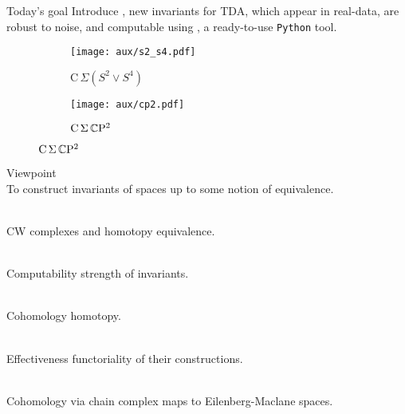
\begin{frame}{Today's goal}
	\pause
	Introduce , new invariants for TDA,
	\pause
	which appear in real-data, are robust to noise, and computable using , a ready-to-use \texttt{Python} tool.

	\pause\medskip
	\vskip-15pt
	\begin{figure}
		\centering
		\begin{subfigure}[b]{0.49\textwidth}
			\centering
			\texttt{[image: aux/s2\_s4.pdf]}
			\caption{$\mathrm C\,\Sigma(S^2 \vee S^4)$}
			\label{f:s2_s4}
		\end{subfigure}
		\begin{subfigure}[b]{0.49\textwidth}
			\centering
			\texttt{[image: aux/cp2.pdf]}
			\caption{$\mathrm C\,\Sigma\,\mathbb{C}\mathrm{P}^2$}
			\label{f:cp2}
		\end{subfigure}
	\end{figure}
\end{frame}

\begin{frame}{Viewpoint}
	\pause
	 \\
	To construct invariants of spaces up to some notion of equivalence.

	\bigskip\pause
	 \\
	CW complexes and homotopy equivalence.

	\bigskip\pause
	 \\
	Computability  strength of invariants.

	\bigskip\pause
	 \\
	Cohomology  homotopy.

	\bigskip\pause
	 \\
	Effectiveness  functoriality of their constructions.

	\bigskip\pause
	 \\
	Cohomology via chain complex  maps to Eilenberg-Maclane spaces.
\end{frame}

